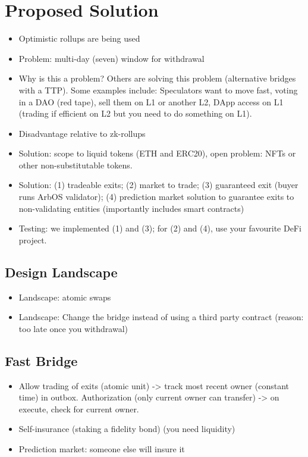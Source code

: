 
\section{Proposed Solution} 



\begin{itemize}
\item Optimistic rollups are being used
\item Problem: multi-day (\eg seven) window for withdrawal
\item Why is this a problem? Others are solving this problem (alternative bridges with a TTP). Some examples include: Speculators want to move fast, voting in a DAO (red tape), sell them on L1 or another L2, DApp access on L1 (trading if efficient on L2 but you need to do something on L1). 
\item Disadvantage relative to zk-rollups
\item Solution: scope to liquid tokens (ETH and ERC20), open problem: NFTs or other non-substitutable tokens. 
\item Solution: (1) tradeable exits; (2) market to trade; (3) guaranteed exit (buyer runs ArbOS validator); (4) prediction market solution to guarantee exits to non-validating entities (importantly includes smart contracts)
\item Testing: we implemented (1) and (3); for (2) and (4), use your favourite DeFi project.
\end{itemize}


\subsection{Design Landscape}

\begin{itemize}
\item Landscape: atomic swaps
\item Landscape: Change the bridge instead of using a third party contract (reason: too late once you withdrawal)
\end{itemize}

\subsection{Fast Bridge} 

\begin{itemize}
\item Allow trading of exits (atomic unit) -> track most recent owner (constant time) in outbox. Authorization (only current owner can transfer) -> on execute, check for current owner. 
\item Self-insurance (staking a fidelity bond) (you need liquidity) 
\item Prediction market: someone else will insure it
\end{itemize}

